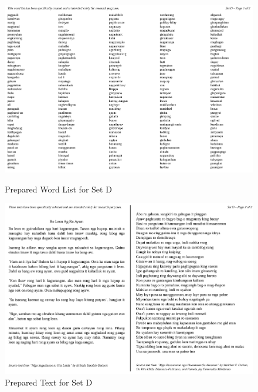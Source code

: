 \begin{figure}[h!]
	\centering
	\includegraphics[width=\textwidth]{./appendix/setD1.png}
	\caption{Prepared Word List for Set D}
	\includegraphics[width=\textwidth]{./appendix/setD2.png}
	\caption{Prepared Text for Set D}
	\label{fig:setD}
\end{figure}

